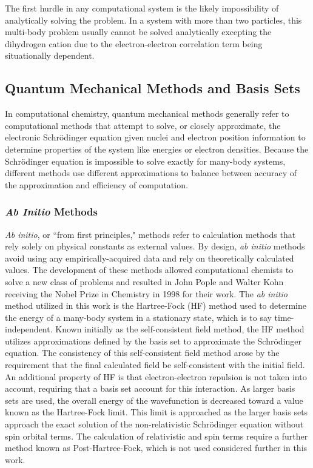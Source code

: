 The first hurdle in any computational system is the likely impossibility of analytically solving the problem. 
In a system with more than two particles, this multi-body problem usually cannot be solved analytically excepting the dihydrogen cation due to the electron-electron correlation term being situationally dependent.

\subsection{Quantum Mechanical Methods and Basis Sets}

In computational chemistry, quantum mechanical methods generally refer to computational methods that attempt to solve, or closely approximate, the electronic Schr\"{o}dinger equation given nuclei and electron position information to determine properties of the system like energies or electron densities.
Because the Schr\"{o}dinger equation is impossible to solve exactly for many-body systems, different methods use different approximations to balance between accuracy of the approximation and efficiency of computation.

\subsubsection{\textit{Ab Initio} Methods}

\textit{Ab initio}, or ``from first principles," methods refer to calculation methods that rely solely on physical constants as external values.
By design, \textit{ab initio} methods avoid using any empirically-acquired data and rely on theoretically calculated values.
The development of these methods allowed computational chemists to solve a new class of problems and resulted in John Pople and Walter Kohn receiving the Nobel Prize in Chemistry in 1998 for their work.
The \textit{ab initio} method utilized in this work is the Hartree-Fock (HF) method used to determine the energy of a many-body system in a stationary state, which is to say time-independent.\cite{hartree_1928}
Known initially as the self-consistent field method, the HF method utilizes approximations defined by the basis set to approximate the Schr\"{o}dinger equation. 
The consistency of this self-consistent field method arose by the requirement that the final calculated field be self-consistent with the initial field.
An additional property of HF is that electron-electron repulsion is not taken into account, requiring that a basis set account for this interaction.
As larger basis sets are used, the overall energy of the wavefunction is decreased toward a value known as the Hartree-Fock limit.
This limit is approached as the larger basis sets approach the exact solution of the non-relativistic Schr\"{o}dinger equation without spin orbital terms.
The calculation of relativistic and spin terms require a further method known as Post-Hartree-Fock, which is not used considered further in this work.

